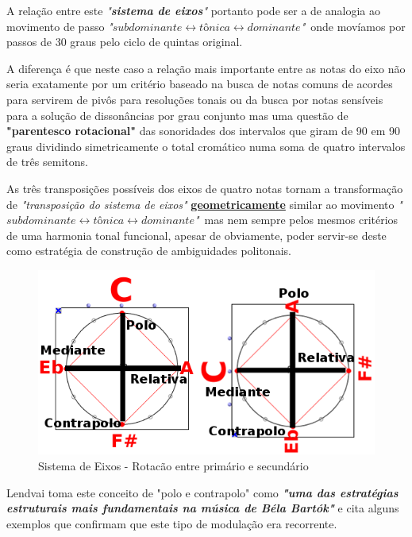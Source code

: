 \documentclass[
	12pt,				%
	openright,			%
	twoside,			%
	a4paper,			%
	english,			%
	french,				%
	spanish,			%
	brazil				%
	]{abntex2}
\begin{document}
A relação entre este \textit{"\textbf{sistema de eixos}"} portanto pode ser a de analogia ao movimento de passo \textit{"$subdominante \leftrightarrow tônica \leftrightarrow dominante$"}\ onde movíamos por passos de 30 graus pelo ciclo de quintas original.  

A diferença é que neste caso a relação mais importante entre as notas do eixo não seria exatamente por um critério baseado na busca de notas comuns de acordes para servirem de pivôs para resoluções tonais ou da busca por notas sensíveis para a solução de dissonâncias por grau conjunto mas uma questão de \textbf{"\textbf{parentesco rotacional}"} das sonoridades dos intervalos que giram de 90 em 90 graus dividindo simetricamente o total cromático numa soma de quatro intervalos de três semitons.

As três transposições possíveis dos eixos de quatro notas tornam a transformação de \textit{"transposição do sistema de eixos"} \textbf{\textbf{\underline{geometricamente}}} similar ao movimento \textit{"$subdominante \leftrightarrow tônica \leftrightarrow dominante$"}\ mas nem sempre pelos mesmos critérios de uma harmonia tonal funcional, apesar de obviamente, poder servir-se deste como estratégia de construção de ambiguidades politonais.

\begin{figure}[!h]
	\caption{\label{fig_grafico}Sistema de Eixos - Rotacão entre primário e secundário}
	\begin{center}
	    \includegraphics[scale=0.4]{axis/PoloContrapolo.png}
	\end{center}
\end{figure}


Lendvai toma este conceito de "polo e contrapolo" como \textit{\textbf{"uma das estratégias estruturais mais fundamentais na música de Béla Bartók"}}\cite[ p.04]{lendvai1971bela} e cita alguns exemplos que confirmam que este tipo de modulação era recorrente.
\end{document}
